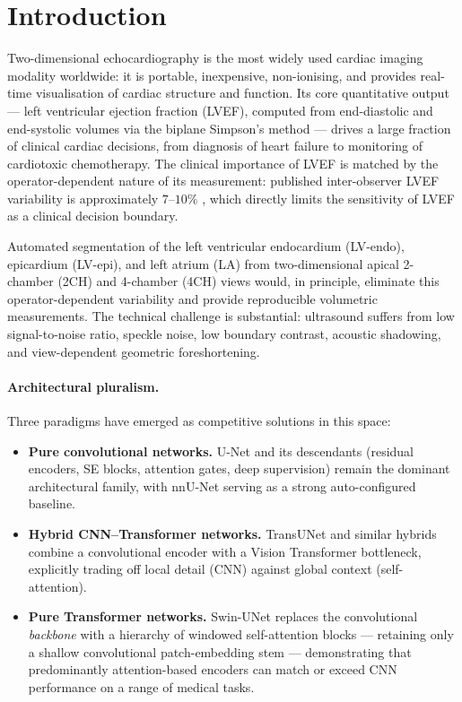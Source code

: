 \section{Introduction}
\label{sec:introduction}

Two-dimensional echocardiography is the most widely used cardiac imaging
modality worldwide: it is portable, inexpensive, non-ionising, and provides
real-time visualisation of cardiac structure and function. Its core
quantitative output --- left ventricular ejection fraction (LVEF), computed
from end-diastolic and end-systolic volumes via the biplane Simpson's method
\citep{lang2015} --- drives a large fraction of clinical cardiac decisions,
from diagnosis of heart failure to monitoring of cardiotoxic chemotherapy.
The clinical importance of LVEF is matched by the operator-dependent
nature of its measurement: published inter-observer LVEF variability is
approximately $7$--$10\%$ \citep{leclerc2019}, which directly limits the
sensitivity of LVEF as a clinical decision boundary.

Automated segmentation of the left ventricular endocardium (LV-endo),
epicardium (LV-epi), and left atrium (LA) from two-dimensional apical
2-chamber (2CH) and 4-chamber (4CH) views would, in principle, eliminate
this operator-dependent variability and provide reproducible volumetric
measurements. The technical challenge is substantial: ultrasound suffers
from low signal-to-noise ratio, speckle noise, low boundary contrast,
acoustic shadowing, and view-dependent geometric foreshortening.

\paragraph{Architectural pluralism.}
Three paradigms have emerged as competitive solutions in this space:
\begin{itemize}[leftmargin=*,nosep]
\item \textbf{Pure convolutional networks.} U-Net
      \citep{ronneberger2015} and its descendants (residual encoders, SE
      blocks, attention gates, deep supervision)
      \citep{milletari2016,oktay2018} remain the dominant architectural
      family, with nnU-Net \citep{isensee2021} serving as a strong
      auto-configured baseline.
\item \textbf{Hybrid CNN--Transformer networks.} TransUNet
      \citep{chen2021transunet} and similar hybrids combine a
      convolutional encoder with a Vision Transformer bottleneck,
      explicitly trading off local detail (CNN) against global context
      (self-attention).
\item \textbf{Pure Transformer networks.} Swin-UNet \citep{cao2022}
      replaces the convolutional \emph{backbone} with a hierarchy of
      windowed self-attention blocks --- retaining only a shallow
      convolutional patch-embedding stem --- demonstrating that
      predominantly attention-based encoders can match or exceed CNN
      performance on a range of medical tasks.
\end{itemize}

